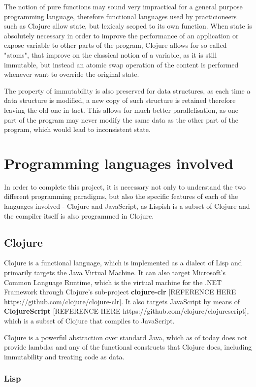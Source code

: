 The notion of pure functions may sound very impractical for a general purpose programming language, therefore functional languages used by practicioneers such as Clojure allow state, but lexicaly scoped to its own function.
When state is absolutely necessary in order to improve the performance of an application or expose variable to other parts of the program, Clojure allows for so called "atoms", that improve on the classical notion of a variable, as it is still immutable, but instead an atomic swap operation of the content is performed whenever want to override the original state.

The property of immutability is also preserved for data structures, as each time a data structure is modified, a new copy of such structure is retained therefore leaving the old one in tact. This allows for much better parallelisation, as one part of the program may never modify the same data as the other part of the program, which would lead to inconsistent state.

\section{Programming languages involved}
In order to complete this project, it is necessary not only to understand the two different programming paradigms, but also the specific features of each of the languages involved - Clojure and JavaScript, as Lispish is a subset of Clojure and the compiler itself is also programmed in Clojure.

\subsection{Clojure}
Clojure is a functional language, which is implemented as a dialect of Lisp and primarily targets the Java Virtual Machine. It can also target Microsoft's Common Language Runtime, which is the virtual machine for the .NET Framework through Clojure's sub-project \textbf{clojure-clr} [REFERENCE HERE https://github.com/clojure/clojure-clr]. 
It also targets JavaScript by means of \textbf{ClojureScript} [REFERENCE HERE https://github.com/clojure/clojurescript], which is a subset of Clojure that compiles to JavaScript. 

Clojure is a powerful abstraction over standard Java, which as of today does not provide lambdas and any of the functional constructs that Clojure does, including immutability and treating code as data.

\subsubsection{Lisp}

